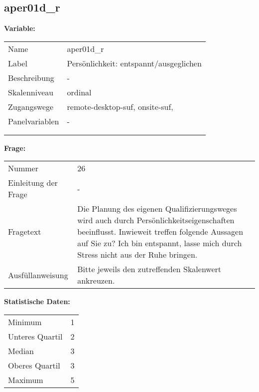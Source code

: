	
	
	\subsection{aper01d\_r}
	\label{subSection:aper01d_r}

	\noindent\textbf{Variable:}\\
		\begin{tabular}{lL{11.3cm}}
			\label{tableVariable:aper01d_r}
			Name & aper01d\_r \\
			Label & Persönlichkeit: entspannt/ausgeglichen \\
			Beschreibung & - \\
			Skalenniveau & ordinal \\
			Zugangswege &
				remote-desktop-suf,
				onsite-suf,
 \\
			Panelvariablen & -
			 \\
			 \\
 \\
		\end{tabular}

		\vspace*{1 cm}
		\noindent\textbf{Frage:}\\
		\begin{tabular}{lL{11.3cm}}
			\label{tableQuestion:aper01d_r}
			Nummer & 26 \\
			Einleitung der Frage & - \\
			Fragetext & Die Planung des eigenen Qualifizierungsweges wird auch durch Persönlichkeitseigenschaften beeinflusst. Inwieweit treffen folgende Aussagen auf Sie zu?
Ich bin entspannt, lasse mich durch Stress nicht aus der Ruhe bringen. \\
			Ausfüllanweisung & Bitte jeweils den zutreffenden
Skalenwert ankreuzen. \\
		\end{tabular}


		\vspace*{1 cm}
		\noindent\textbf{Statistische Daten:}\\
			\begin{tabular}{ll}
				\label{tableStatistics:aper01d_r}
					Minimum & 1 \\
					Unteres Quartil & 2 \\
					Median & 3 \\
					Oberes Quartil & 3 \\
					Maximum & 5 \\
			\end{tabular}




